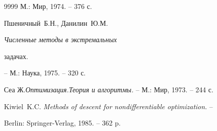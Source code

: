 \begin{thebibliography}{9999}
М.: Мир, 1974. -- 376 с.







Пшеничный~Б.Н., Данилин~Ю.М. {\em Численные методы в экстремальных


задачах.} -- М.: Наука, 1975. -- 320 с.







Сеа Ж.{\em Оптимизация.Теория и алгоритмы.} -- М.: Мир, 1973. -- 244 с.







Kiwiel~K.C. {\em Methods of descent for nondifferentiable optimization.} --


Berlin: Springer-Verlag, 1985. -- 362 p.





\end{thebibliography}





\vskip 2cm












\label{end}





